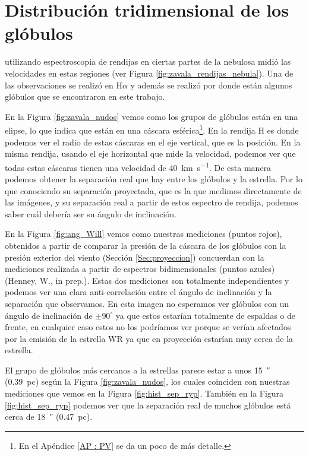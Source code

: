 \documentclass{book}
\begin{document}

\section{Distribución tridimensional de los glóbulos} \label{sec: distrtibucion}

\cite{Zavala:2022} utilizando espectroscopia de rendijas en ciertas
partes de la nebulosa midió las velocidades en estas regiones (ver
Figura \ref{fig:zavala_rendijas_nebula}). Una de las observaciones se
realizó en H$\alpha$ y además se realizó por donde están algunos glóbulos
que se encontraron en este trabajo.

En la Figura \ref{fig:zavala_nudos} vemos como los grupos de glóbulos
están en una elipse, lo que indica que están en una cáscara
esférica\footnote{En el Apéndice \ref{AP : PV} se da un poco de más
  detalle.}. En la rendija H es donde podemos ver el radio de estas
cáscaras en el eje vertical, que es la posición. En la misma rendija,
usando el eje horizontal que mide la velocidad, podemos ver que todas
estas cáscaras tienen una velocidad de \SI{40}{km.s^{-1}}. De esta
manera podemos obtener la separación real que hay entre los glóbulos y
la estrella. Por lo que conociendo su separación proyectada, que es la
que medimos directamente de las imágenes, y su separación real a
partir de estos espectro de rendija, podemos saber cuál debería ser su
ángulo de inclinación.

En la Figura \ref{fig:ang_Will} vemos como nuestras mediciones (puntos
rojos), obtenidos a partir de comparar la presión de la cáscara de los
glóbulos con la presión exterior del viento (Sección
\ref{Sec:proyeccion}) concuerdan con la mediciones realizada a partir
de espectros bidimensionales (puntos azules) (Henney, W., in prep.).
Estas dos mediciones son totalmente independientes y podemos ver una
clara anti-correlación entre el ángulo de inclinación y la separación
que observamos. En esta imagen no esperamos ver glóbulos con un ángulo
de inclinación de $\pm 90^\circ$ ya que estos estarían totalmente de
espaldas o de frente, en cualquier caso estos no los podríamos ver
porque se verían afectados por la emisión de la estrella WR ya que en
proyección estarían muy cerca de la estrella.

El grupo de glóbulos más cercanos a la estrellas parece estar a unos
\SI{15}{\arcsecond} (\SI{0.39}{pc}) según la Figura
\ref{fig:zavala_nudos}, los cuales coinciden con nuestras mediciones
que vemos en la Figura \ref{fig:hist_sep_ryp}. También en la Figura
\ref{fig:hist_sep_ryp} podemos ver que la separación real de muchos
glóbulos está cerca de \SI{18}{\arcsecond} (\SI{0.47}{pc}).
\end{document}
